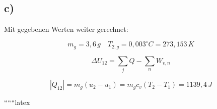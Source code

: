 

\subsection*{c)}

Mit gegebenen Werten weiter gerechnet:

\[
m_g = 3{,}6 \, g \quad T_{2,g} = 0{,}003^\circ C = 273{,}153 \, K
\]

\[
\Delta U_{12} = \sum_j Q - \sum_n W_{v,n}
\]

\[
|Q_{12}| = m_g (u_2 - u_1) = m_g c_v (T_2 - T_1) = 1139{,}4 \, J
\]

``````latex